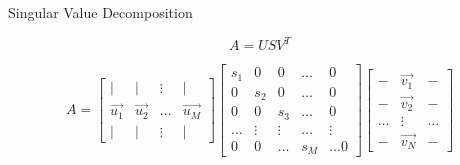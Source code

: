 \documentclass{beamer}
\begin{document}
\begin{frame}{Singular Value Decomposition}

\[ A = U S V^T \]


\[ A =  \left[ \begin{array}{cccc} | & | & \vdots & | \\ \vec{u_1} & \vec{u_2} & \hdots & \vec{u_M} \\ | & | & \vdots & | \end{array} \right]  \left[  \begin{array}{ccccc} s_1 & 0 & 0 & \hdots & 0 \\ 0 & s_2 & 0 & \hdots & 0 \\ 0 & 0 & s_3 & \hdots & 0 \\ \hdots & \vdots & \vdots & \hdots & \vdots \\ 0 & 0 & \hdots & s_M & \hdots 0  \end{array} \right] \left[ \begin{array}{ccc} - & \vec{v_1} & - \\ - & \vec{v_2} & - \\ \hdots & \vdots & \hdots \\ - & \vec{v_N} & - \end{array} \right] \]

\begin{itemize}[label=$\vartriangleright$]





\end{itemize}

\end{frame}
\end{document}
